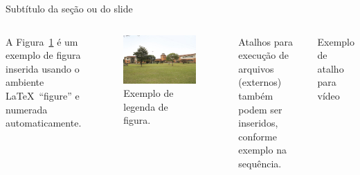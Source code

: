 \documentclass[%
  10pt,%
  aspectratio = 169,%
  compress,%
  t,%
]{beamer}%
\begin{document}
\begin{frame}{}{Subtítulo da seção ou do slide}
\begin{columns}[t]
A Figura~\ref{fig:campuspontagrossa} é um exemplo de figura inserida usando o ambiente \LaTeX\ ``figure'' e numerada automaticamente.
\begin{figure}[!htb]
\centering
\caption{Exemplo de legenda de figura.}
\label{fig:campuspontagrossa}
\includegraphics[width = 0.75\columnwidth]{./Figuras/campuspontagrossa}
\end{figure}
Atalhos para execução de arquivos (externos) também podem ser inseridos, conforme exemplo na sequência.
\begin{block}{Exemplo de atalho para vídeo}
\end{block}
\end{columns}
\end{frame}
\end{document}
